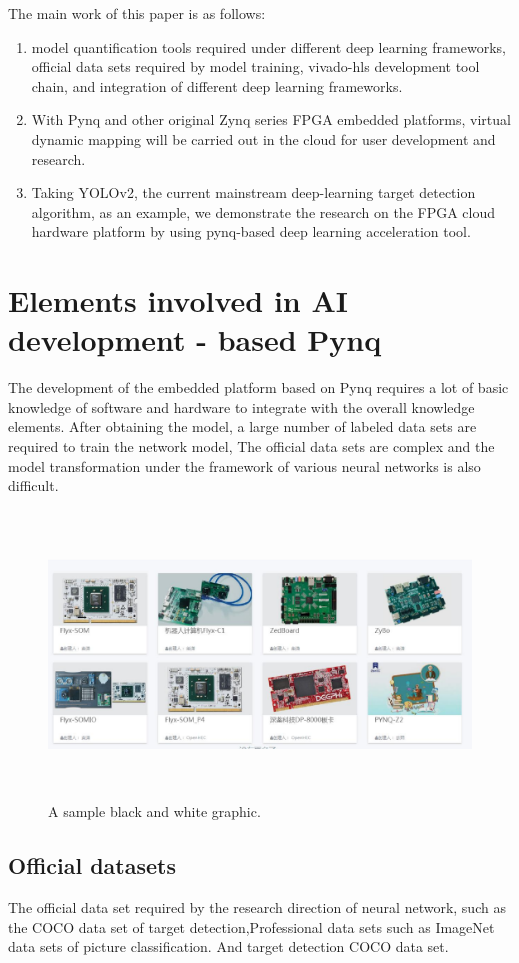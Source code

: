 The main work of this paper is as follows:
\begin{enumerate}
    \item model quantification tools required under different deep learning frameworks, official data sets required by model training, vivado-hls development tool chain, and integration of different deep learning frameworks.
    \item With Pynq and other original Zynq series FPGA embedded platforms, virtual dynamic mapping will be carried out in the cloud for user development and research.
    \item Taking YOLOv2, the current mainstream deep-learning target detection algorithm, as an example, we demonstrate the research on the FPGA cloud hardware platform by using pynq-based deep learning acceleration tool.
\end{enumerate}

\section{Elements involved in AI development - based Pynq}
The development of the embedded platform based on Pynq requires a lot of basic knowledge of software and hardware to integrate with the overall knowledge elements. After obtaining the model, a large number of labeled data sets are required to train the network model, The official data sets are complex and the model transformation under the framework of various neural networks is also difficult.

\begin{figure}
\includegraphics[height=3in, width=6in]{figure_1}
\caption{A sample black and white graphic.}
\end{figure}

\subsection{Official datasets}
The official data set required by the research direction of neural network, such as the COCO data set of target detection,Professional data sets such as ImageNet data sets of picture classification. And target detection COCO data set.

